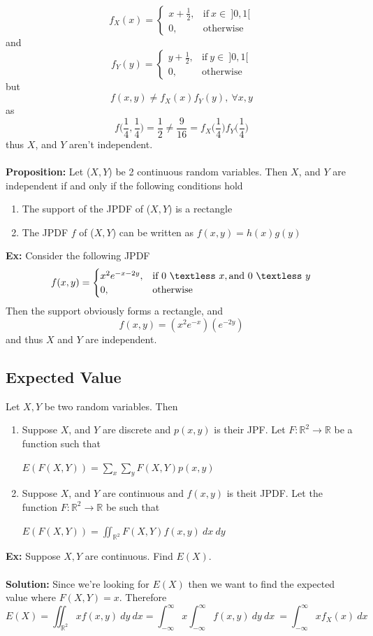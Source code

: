 \documentclass{article}
\newcommand{\R}{\mathbb{R}}
\newcommand{\lt}{\textless}
\newcommand{\prop}{\textbf{Proposition: }}
\newcommand{\exx}{\textbf{Ex: }}
\newcommand{\soln}{\textbf{Solution: }}
\begin{document}
\[
f_{X}(x) =
\begin{cases}
	x+\frac{1}{2}, &\text{if}\ x \in\ ]0, 1[\\
	0, &\text{otherwise}
\end{cases}
\]
and
\[
f_{Y}(y) =
\begin{cases}
	y+\frac{1}{2}, &\text{if}\ y \in\ ]0, 1[\\
	0, &\text{otherwise}
\end{cases}
\]
but
\[f(x, y) \neq f_{X}(x)f_{Y}(y),\ \forall x, y\]
as
\[f\Big(\frac{1}{4}, \frac{1}{4}\Big) = \frac{1}{2}\neq \frac{9}{16} = f_{X}\Big(\frac{1}{4}\Big)f_{Y}\Big(\frac{1}{4}\Big)\]
thus $X$, and $Y$ aren't independent.\\\\
\prop Let ($X, Y$) be 2 continuous random variables. Then $X$, and $Y$ are independent if and only if the following conditions hold
\begin{enumerate}
	\item The support of the JPDF of ($X, Y$) is a rectangle
	\item The JPDF $f$ of ($X, Y$) can be written as $f(x, y) = h(x)g(y)$
\end{enumerate}
\exx Consider the following JPDF
\[
f(x, y) =
\begin{cases}
	x^{2}e^{-x-2y}, &\text{if}\ 0\ \lt\ x, \text{and}\ 0\ \lt\ y\\
	0, &\text{otherwise}
\end{cases}
\]
Then the support obviously forms a rectangle, and
\[f(x, y) = (x^{2}e^{-x})(e^{-2y})\]
and thus $X$ and $Y$ are independent.
\subsection{Expected Value}
Let $X, Y$ be two random variables. Then
\begin{enumerate}
	\item Suppose $X$, and $Y$ are discrete and $p(x, y)$ is their JPF. Let $F : \R^{2} \to \R$ be  a function such that \begin{center}$\displaystyle E(F(X, Y))= \sum_{x}\sum_{y}F(X, Y)p(x, y)$\end{center}
	\item Suppose $X$, and $Y$ are continuous and $f(x, y)$ is theit JPDF.  Let the function $F : \R^{2} \to \R$ be such that \begin{center}$\displaystyle E(F(X, Y))= \iint_{\R^{2}}F(X, Y)f(x, y)\ dx\ dy$\end{center}
\end{enumerate}
\exx Suppose $X, Y$ are continuous. Find $E(X)$.\\\\
\soln Since we're looking for $E(X)$ then we want to find the expected value where $F(X, Y) = x$. Therefore
\[E(X) = \iint_{\R^{2}}x f(x, y)\ dy\ dx = \int_{-\infty}^{\infty} x \int_{-\infty}^{\infty} f(x, y)\ dy\ dx\ = \int_{-\infty}^{\infty} xf_{X}(x)\ dx\]
\newpage
\end{document}
